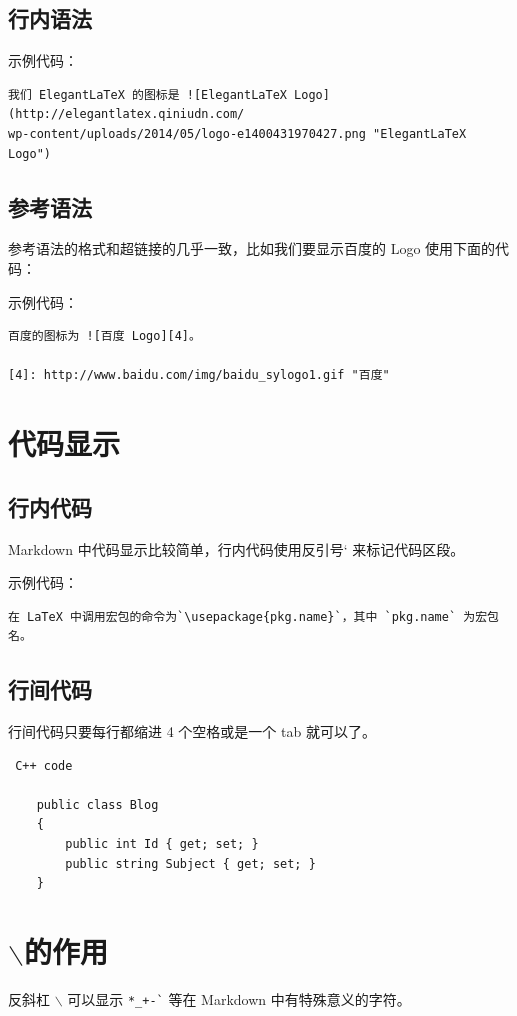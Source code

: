 \subsection{行内语法}
示例代码：
\begin{verbatim}
我们 ElegantLaTeX 的图标是 ![ElegantLaTeX Logo](http://elegantlatex.qiniudn.com/
wp-content/uploads/2014/05/logo-e1400431970427.png "ElegantLaTeX Logo")
\end{verbatim}


\subsection{参考语法}
参考语法的格式和超链接的几乎一致，比如我们要显示百度的 Logo 使用下面的代码：

示例代码：
\begin{verbatim}
百度的图标为 ![百度 Logo][4]。

[4]: http://www.baidu.com/img/baidu_sylogo1.gif "百度"
\end{verbatim}


\section{代码显示}
\subsection{行内代码}
Markdown 中代码显示比较简单，行内代码使用反引号` 来标记代码区段。

示例代码：
\begin{verbatim}
在 LaTeX 中调用宏包的命令为`\usepackage{pkg.name}`，其中 `pkg.name` 为宏包名。
\end{verbatim}


\subsection{行间代码}
行间代码只要每行都缩进 4 个空格或是一个 tab 就可以了。
\begin{verbatim}
 C++ code

    public class Blog
    {
        public int Id { get; set; }
        public string Subject { get; set; }
    }
\end{verbatim}


\section{$\backslash$的作用}
反斜杠 $\backslash$  可以显示 \verb|*_+-`| 等在 Markdown 中有特殊意义的字符。


















